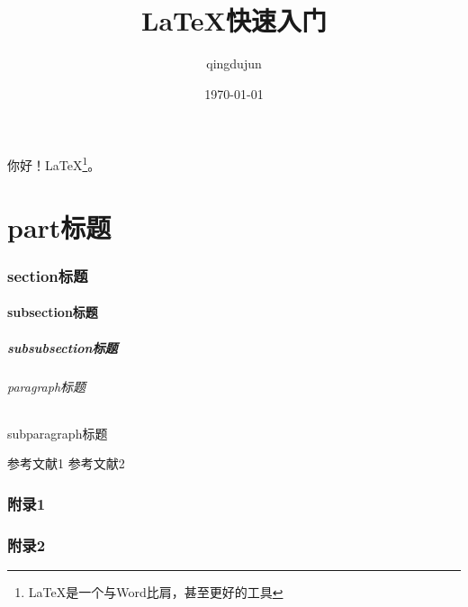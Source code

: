 \documentclass[11pt, a4paper]{article}
\title{LaTeX快速入门}
\author{qingdujun}
\date{\today}
\begin{document}
\maketitle
你好！LaTeX\footnote{LaTeX是一个与Word比肩，甚至更好的工具}。
\part{part标题}
\section{section标题}
\subsection{subsection标题}
\subsubsection{subsubsection标题}
\paragraph{paragraph标题}
\subparagraph{subparagraph标题}
\begin{thebibliography}{99}
 参考文献1
 参考文献2
\end{thebibliography}
\begin{appendix}
\section{附录1}
\section{附录2}
\end{appendix}
\end{document}
